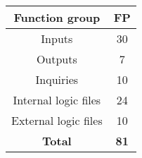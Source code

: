 \begin{center}
\begin{tabular}{|c|c|}
\hline
\multicolumn{1}{|c|}{\textbf{Function group}} & \multicolumn{1}{c|}{\textbf{FP}}\\
\hline
Inputs					&30\\
Outputs					&7\\
Inquiries				&10\\
Internal logic files	&24\\
External logic files	&10\\
\hline
\multicolumn{1}{|c|}{\textbf{Total}} & \multicolumn{1}{c|}{\textbf{81}}\\
\hline
\end{tabular}
\end{center}

